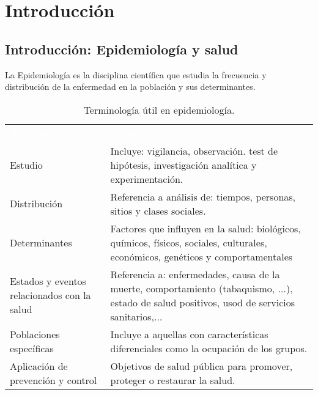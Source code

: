 \chapter{Introducción}
\section{Introducción: Epidemiología y salud}
La Epidemiología es la disciplina científica que estudia la frecuencia y distribución de la enfermedad en la población y sus determinantes.
\begin{table}[H]
	\centering
	\begin{tabular}{M{2.5cm}N{13.5cm}}
		\textcolor{white}{\textbf{Término}}&\textcolor{white}{\textbf{Definición}}\\
		Estudio&Incluye: vigilancia, observación. test de hipótesis, investigación analítica y experimentación.\\
		Distribución&Referencia a análisis de: tiempos, personas, sitios y clases sociales.\\
		Determinantes&Factores que influyen en la salud: biológicos, químicos, físicos, sociales, culturales, económicos, genéticos y comportamentales\\
		Estados y eventos relacionados con la salud&Referencia a: enfermedades, causa de la muerte, comportamiento (tabaquismo, $\dots$), estado de salud positivos, usod de servicios sanitarios,$\dots$\\
		Poblaciones específicas& Incluye a aquellas con características diferenciales como la ocupación de los grupos.\\
		Aplicación de prevención y control&Objetivos de salud pública para promover, proteger o restaurar la salud.\\
		\hline
	\end{tabular}
	\caption{Terminología útil en epidemiología.}
\end{table}

